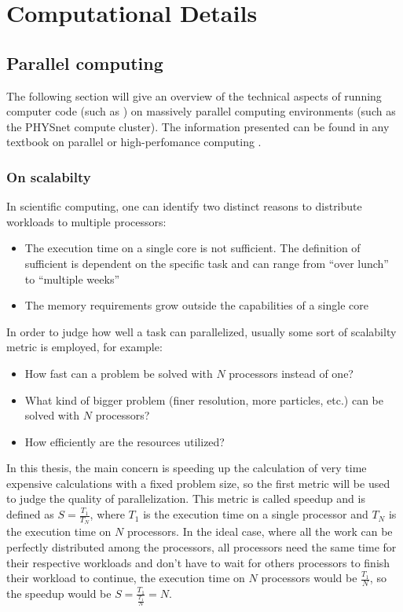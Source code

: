 \documentclass[main.tex]{subfiles}
\begin{document}
\chapter{Computational Details\label{ch:computation}}

\section{Parallel computing\label{sec:parallel_computing}}

The following section will give an overview of the technical aspects of running computer code (such as \QE) on massively parallel computing environments (such as the PHYSnet compute cluster).
The information presented can be found in any textbook on parallel or high-perfomance computing \cite{hager_introduction_2010}.

\subsection{On scalabilty}\label{sub:scalability_general}

In scientific computing, one can identify two distinct reasons to distribute workloads to multiple processors:
\begin{itemize}
    \item The execution time on a single core is not sufficient. The definition of sufficient is dependent on the specific task and can range from \enquote{over lunch} to \enquote{multiple weeks}
    \item The memory requirements grow outside the capabilities of a single core
\end{itemize}


In order to judge how well a task can parallelized, usually some sort of scalabilty metric is employed, for example:
\begin{itemize}
    \item How fast can a problem be solved with \(N\) processors instead of one?
    \item What kind of bigger problem (finer resolution, more particles, etc.) can be solved with \(N\) processors?
    \item How efficiently are the resources utilized?
\end{itemize}
In this thesis, the main concern is speeding up the calculation of very time expensive calculations with a fixed problem size, so the first metric will be used to judge the quality of parallelization.
This metric is called speedup and is defined as \(S = \frac{T_1}{T_N}\), where \(T_1\) is the execution time on a single processor and \(T_N\) is the execution time on \(N\) processors.
In the ideal case, where all the work can be perfectly distributed among the processors, all processors need the same time for their respective workloads and don't have to wait for others processors to finish their workload to continue, the execution time on \(N\) processors would be \(\frac{T_1}{N}\), so the speedup would be \(S = \frac{T_1}{\frac{T_1}{N}} = N\).
\end{document}
